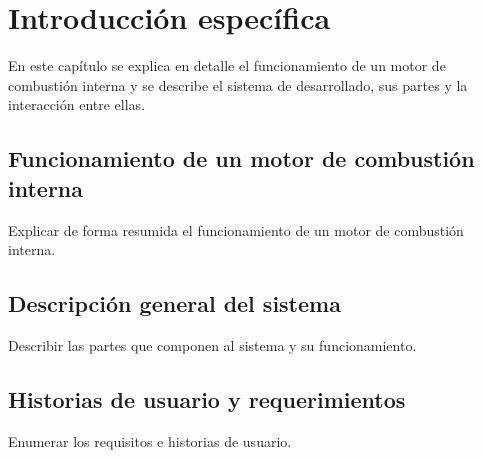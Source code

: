 \chapter{Introducción específica} %

\label{Chapter2}

En este capítulo se explica en detalle el funcionamiento de un motor de combustión interna y se describe el sistema de desarrollado, sus partes y la interacción entre ellas.

\section{Funcionamiento de un motor de combustión interna}

Explicar de forma resumida el funcionamiento de un motor de combustión interna.

\section{Descripción general del sistema}

Describir las partes que componen al sistema y su funcionamiento.

\section{Historias de usuario y requerimientos}

Enumerar los requisitos e historias de usuario.